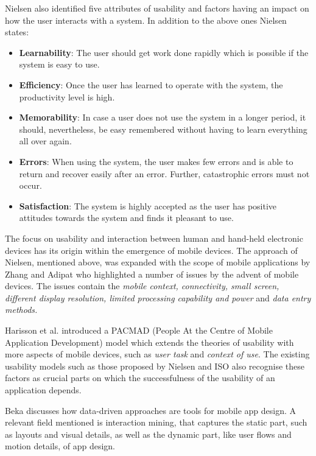 Nielsen \cite{nielsen1994usability} also identified five attributes of usability and factors having an impact on how the user interacts with a system. In addition to the above ones Nielsen \cite{nielsen1994} states:

\begin{itemize}
	
	\item \textbf{Learnability}: The user should get work done rapidly which is possible if the system is easy to use.
	\item \textbf{Efficiency}: Once the user has learned to operate with the system, the productivity level is high.
	\item \textbf{Memorability}: In case a user does not use the system in a longer period, it should, nevertheless, be easy remembered without having to learn everything all over again.	
	\item \textbf{Errors}: When using the system, the user makes few errors and is able to return and recover easily after an error. Further, catastrophic errors must not occur.
	\item \textbf{Satisfaction}: The system is highly accepted as the user has positive attitudes towards the system and finds it pleasant to use.
\end{itemize}

The focus on usability and interaction between human and hand-held electronic devices has its origin within the emergence of mobile devices. The approach of Nielsen, mentioned above, was expanded with the scope of mobile applications by Zhang and Adipat \cite{zhang2005challenges} who highlighted a number of issues by the advent of mobile devices. The issues contain the \textit{mobile context, connectivity, small screen, different display resolution, limited processing capability and power} and \textit{data entry methods.}

Harisson et al. \cite{harrison2013usability} introduced a PACMAD (People At the Centre of Mobile Application Development) model which extends the theories of usability with more aspects of mobile devices, such as \textit{user task} and \textit{context of use}. The existing usability models such as those proposed by Nielsen \cite{nielsen1994usability} and ISO \cite{bevan1998iso} also recognise these factors as crucial parts on which the successfulness of the usability of an application depends.

Beka \cite{deka2016data} discusses how data-driven approaches are tools for mobile app design. A relevant field mentioned is interaction mining, that captures the static part, such as layouts and visual details, as well as the dynamic part, like user flows and motion details, of app design.

